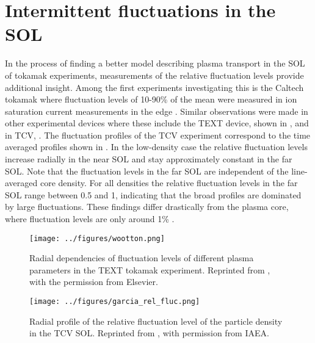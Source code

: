 \section{Intermittent fluctuations in the SOL}
In the process of finding a better model describing plasma transport in the SOL of
tokamak experiments, measurements of the relative fluctuation levels provide additional
insight. Among the first experiments investigating this is the Caltech tokamak where
fluctuation levels of 10-90\% of the mean were measured in ion saturation current
measurements in the edge \cite{zweben1982edge,zweben1983scaling}. Similar observations
were made in other experimental devices where these include the TEXT device, shown in
, and in TCV, . The fluctuation profiles
of the TCV experiment correspond to the time averaged profiles shown in
. In the low-density case the relative fluctuation levels
increase radially in the near SOL and stay approximately constant in the far SOL. Note
that the fluctuation levels in the far SOL are independent of the line-averaged core
density. For all densities the relative fluctuation levels in the far SOL range between
0.5 and 1, indicating that the broad profiles are dominated by large fluctuations. These
findings differ drastically from the plasma core, where fluctuation levels are only
around 1\% \cite{mckee2007plasma}.
\begin{figure}
  \centering
  \begin{minipage}{.48\linewidth}
    \texttt{[image: ../figures/wootton.png]}
    \caption{Radial dependencies of fluctuation levels of different plasma parameters in the TEXT tokamak experiment. Reprinted from \cite{wootton1990edge}, with the permission from Elsevier.}
    \label{Fig:wootton}
  \end{minipage}
  \hfill
  \begin{minipage}{.48\linewidth}
    \texttt{[image: ../figures/garcia\_rel\_fluc.png]}
    \caption{Radial profile of the relative fluctuation level of the particle density in the TCV SOL. Reprinted from \cite{garcia2007fluctuations}, with permission from IAEA.}
    \label{Fig:garcia_rel_fluc}
  \end{minipage}
\end{figure}

